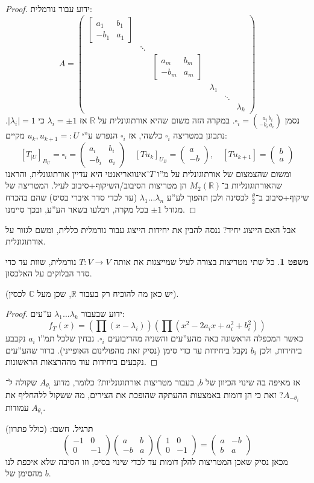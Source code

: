 \documentclass[a4paper]{article}
\newcommand\R     {\mathbb{R}}
\newcommand\C     {\mathbb{C}}
\newcommand\ta    {\theta}
\newcommand\co        {\colon}
\newcommand\pms[1]    {\begin{pmatrix}
		#1
\end{pmatrix}}
\newcommand\bms[1]    {\begin{bmatrix}
		#1
\end{bmatrix}}
\renewcommand\lg      {\lambda}
\newcommand\cl [1]    {\left ( #1 \right )}
\theoremstyle{definition}
\newtheorem{Theorem}{\color{myblue}משפט}
\newcommand\theo  [1] {\begin{Theorem}#1\end{Theorem}}
\begin{document}
	
	\begin{proof}
		ידוע עבור נורמלית: 
		\[ A = \pms{\bms{a_1 & b_1 \\ -b_1 & a_1} \\ & \ddots \\ &&\bms{a_m & b_m \\ -b_m & a_m} \\ &&& \lg_1 \\ &&&&\ddots \\ &&&&&\lg_k} \]
		נסמן $\square_i = \binom{\,\, a_i \, b_i}{-b_i \, a_i}$.
		במקרה הזה משום שהיא אורתוגונלית על $\R$ אז $\lg_i = \pm1$ כי $|\lg_i| = 1$. נתבונן במטריצה $\square_i$ כלשהי, אז $\square_i$ הנפרש ע''י $u_k, u_{k + 1} =: U$ מקיים: 
		\[ [T_{|U}]_{B_U} = \square_i = \pms{a_i & b_i \\ -b_i & a_i}\quad [Tu_k]_{U_B} = \pms{a \\ -b}, \quad [Tu_{k + 1}] = \pms{b \\ a} \]
		ומשום שהצמצום של אורתוגונלית על מ''ו $T$־אינוואריאנטי היא עדיין אורתוגונלית, והראנו שהאורתוגונליות ב־$M_2(\R)$ הן מטריצות הסיבוב/השיקוף+סיבוב לעיל. המטריצה של שיקוף+סיבוב ב־$\frac{\ta}{2}$ לכסינה ולכן תהפוך לע''ע $\lg_1 \dots \lg_n$ (עד לכדי סדר איברי בסיס) שהם בהכרח מגודל $\pm 1$ בכל מקרה, ויבלעו בשאר הע''ע, ובכך סיימנו. 
	\end{proof}
	
	אבל האם הייצוג יחיד? ננסה להבין את יחידות הייצוג עבור נורמלית כללית, ומשם לגזור על אורתוגונלית. 
	
	\theo{כל שתי מטריצות בצורה לעיל שמייצגות את אותה $T \co V \to V$ נורמלית, שוות עד כדי סדר הבלוקים על האלכסון. }
	
	(יש כאן מה להוכיח רק בעבור $\R$, שכן מעל $\C$ לכסין). 
	\begin{proof}
		ידוע שבעבור $\lg_1 \dots \lg_k$ ע''עים: 
		\[ f_T(x) = \cl{\prod (x - \lg_i)} \cl{\prod (x^2 - 2a_ix + a_i^2 + b_i^2)} \]
		כאשר המכפלה הראשונה באה מהע''עים והשניה מהריבועים $\square_i$. נבחין שלכל תמ''ו $a_i$ נקבבע ביחידות, ולכן $b_i$ נקבל ביחידות עד כדי סימן (נסיק זאת מהפולינום האופייני). ברור שהע''עים נקבעים ביחידות עוד מההרצאות הראשונות. 
	\end{proof}
	אז מאיפה בה שינוי הכיוון של $b$, בעבור מטריצות אורתוגונליות? כלומר, מדוע $A_{\ta_i}$ שקולה ל־$A_{-\ta_i}$? זאת כי הן דומות באמצעות ההעתקה שהופכת את הצירים, מה ששקול ללהחליף את עמודות $A_{\ta_i}$. 
	
	\textbf{תרגיל. }חשבו: (כולל פתרון)
	\[ \pms{-1 & 0 \\ 0 & -1}\pms{a & b \\ -b & a}\pms{1 & 0 \\ 0 & -1} = \pms{a & -b \\ b & a} \]
	מכאן נסיק שאכן המטריצות להלן דומות עד לכדי שינוי בסיס, וזו הסיבה שלא איכפת לנו מהסימן של $b$. 
	
\end{document}
